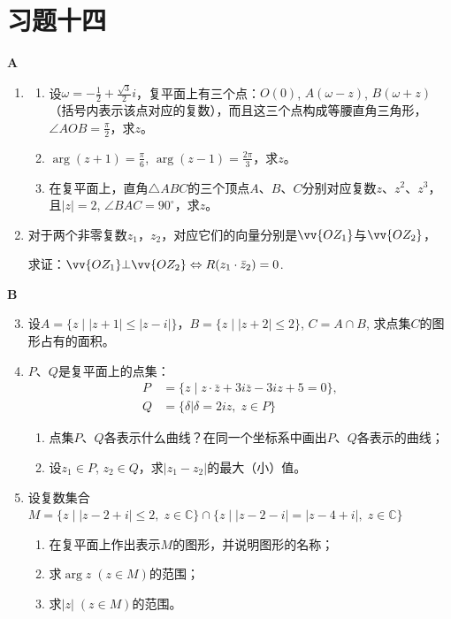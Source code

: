 \section*{习题十四}
\begin{center}
    \bfseries A
\end{center}
\begin{enumerate}
    \item \begin{enumerate}[(1)]
    \item 设$\omega=-\frac{1}{2}+\frac{\sqrt{3}}{2}i$，复平面上有三个点：$O(0)$,
    $A(\omega-z)$, $B(\omega+z)$（括号内表示该点对应的复数），而且这三个点构成等腰直角三角形，$\angle AOB=\frac{\pi}{2}$，求$z$。
    \item $\arg(z+1)=\frac{\pi}{6}$, $\arg(z-1)=\frac{2\pi}{3}$，求$z$。
    \item 在复平面上，直角$\triangle ABC$的三个顶点$A$、$B$、$C$分别对应复数$z$、$z^2$、$z^3$，且$|z|=2$, $\angle BAC=90^{\circ}$，求$z$。
    \end{enumerate}

    \item 对于两个非零复数$z_1$，$z_2$，对应它们的向量分别是$\vv{OZ_1}$与$\vv{OZ_2}$，
    
    求证：$\vv{OZ_1}\bot\vv{OZ_2}\Leftrightarrow R(z_1\cdot \bar z_2)=0$.
\end{enumerate}
    
\begin{center}
    \bfseries B
\end{center}
\begin{enumerate}\setcounter{enumi}{2}
    \item 设$A=\{z\mid |z+1|\le |z-i|\}$，$B=\{z\mid |z+2|\le 2\}$, $C=A\cap B$,
    求点集$C$的图形占有的面积。
    \item $P$、$Q$是复平面上的点集：
\[\begin{split}
    P&=\{z\mid z\cdot \bar z+3i\bar z-3iz+5=0\},\\
    Q&=\{\delta |\delta =2iz,\; z\in P\}
\end{split}\]
\begin{enumerate}[(1)]
\item 点集$P$、$Q$各表示什么曲线？在同一个坐标系中画出$P$、$Q$各表示的曲线；
\item 设$z_1\in P$, $z_2\in Q$，求$|z_1-z_2|$的最大（小）值。
\end{enumerate}

    \item 设复数集合$M=\{z\mid |z-2+i|\le 2,\; z\in\mathbb{C}\}\cap\{z\mid |z-2-i|=|z-4+i|,\; z\in\mathbb{C}\}$
\begin{enumerate}[(1)]
\item 在复平面上作出表示$M$的图形，并说明图形的名称；
\item 求$\arg z\; (z\in M)$的范围；
\item 求$|z|\; (z\in M)$的范围。 
\end{enumerate}
\end{enumerate}


